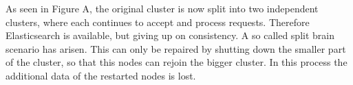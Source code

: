 As seen in Figure A, the original cluster is now split into two independent clusters, where each continues to accept and process requests. Therefore Elasticsearch is available, but giving up on consistency. A so called split brain scenario has arisen. This can only be repaired by shutting down the smaller part of the cluster, so that this nodes can rejoin the bigger cluster. In this process the additional data of the restarted nodes is lost.


